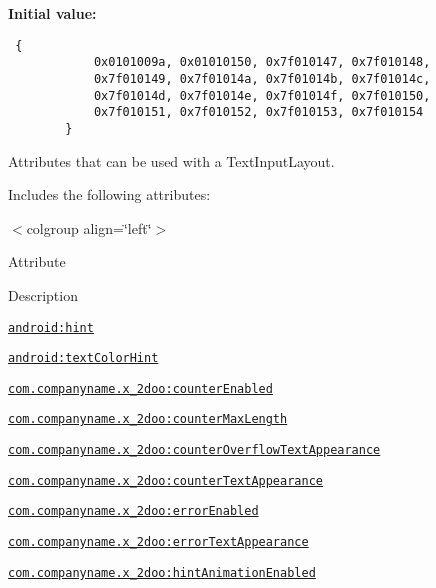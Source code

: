 \textbf{Initial value:}

\begin{Code}\begin{verbatim} {
            0x0101009a, 0x01010150, 0x7f010147, 0x7f010148,
            0x7f010149, 0x7f01014a, 0x7f01014b, 0x7f01014c,
            0x7f01014d, 0x7f01014e, 0x7f01014f, 0x7f010150,
            0x7f010151, 0x7f010152, 0x7f010153, 0x7f010154
        }
\end{verbatim}
\end{Code}
Attributes that can be used with a TextInputLayout. 

Includes the following attributes: \begin{TabularC}{0}
\hline
\end{TabularC}
$<$colgroup align=\char`\"{}left\char`\"{}$>$ 

Attribute

Description 

{\tt \hyperlink{classandroid_1_1support_1_1v4_1_1_r_1_1styleable_2296977f7a733d53ec47e700d4130151}{android:hint}}

{\tt \hyperlink{classandroid_1_1support_1_1v4_1_1_r_1_1styleable_1e92f2247843ef875eda6c3045e73bbd}{android:textColorHint}}

{\tt \hyperlink{classandroid_1_1support_1_1v4_1_1_r_1_1styleable_93a894bdcf077508cc30b9d7bfa9662d}{com.companyname.x\_\-2doo:counterEnabled}}

{\tt \hyperlink{classandroid_1_1support_1_1v4_1_1_r_1_1styleable_a890e200b03fe1fa48be3fe870435e18}{com.companyname.x\_\-2doo:counterMaxLength}}

{\tt \hyperlink{classandroid_1_1support_1_1v4_1_1_r_1_1styleable_0666dd9e90421e9415028a87a4bfd4d3}{com.companyname.x\_\-2doo:counterOverflowTextAppearance}}

{\tt \hyperlink{classandroid_1_1support_1_1v4_1_1_r_1_1styleable_e2035c0839f7355fa9fda8b0c9a8dd46}{com.companyname.x\_\-2doo:counterTextAppearance}}

{\tt \hyperlink{classandroid_1_1support_1_1v4_1_1_r_1_1styleable_552cb08a36003494a2f75ebfe70de3f7}{com.companyname.x\_\-2doo:errorEnabled}}

{\tt \hyperlink{classandroid_1_1support_1_1v4_1_1_r_1_1styleable_5d6bfe2c5003f1a81addf1df4b6e7503}{com.companyname.x\_\-2doo:errorTextAppearance}}

{\tt \hyperlink{classandroid_1_1support_1_1v4_1_1_r_1_1styleable_13f535700725e41671bac1815f26fc74}{com.companyname.x\_\-2doo:hintAnimationEnabled}}

